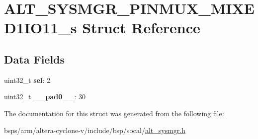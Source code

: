 \hypertarget{structALT__SYSMGR__PINMUX__MIXED1IO11__s}{}\section{A\+L\+T\+\_\+\+S\+Y\+S\+M\+G\+R\+\_\+\+P\+I\+N\+M\+U\+X\+\_\+\+M\+I\+X\+E\+D1\+I\+O11\+\_\+s Struct Reference}
\label{structALT__SYSMGR__PINMUX__MIXED1IO11__s}
\subsection*{Data Fields}
\begin{DoxyCompactItemize}
\item 
\mbox{\label{structALT__SYSMGR__PINMUX__MIXED1IO11__s_aa4067636924d39f61efc9fd52b674983}} 
uint32\+\_\+t {\bfseries sel}\+: 2
\item 
\mbox{\label{structALT__SYSMGR__PINMUX__MIXED1IO11__s_ab9d94e57a1e12c4509e808ec9a989fdf}} 
uint32\+\_\+t {\bfseries \+\_\+\+\_\+pad0\+\_\+\+\_\+}\+: 30
\end{DoxyCompactItemize}


The documentation for this struct was generated from the following file\+:\begin{DoxyCompactItemize}
\item 
bsps/arm/altera-\/cyclone-\/v/include/bsp/socal/\mbox{\hyperlink{alt__sysmgr_8h}{alt\+\_\+sysmgr.\+h}}\end{DoxyCompactItemize}
